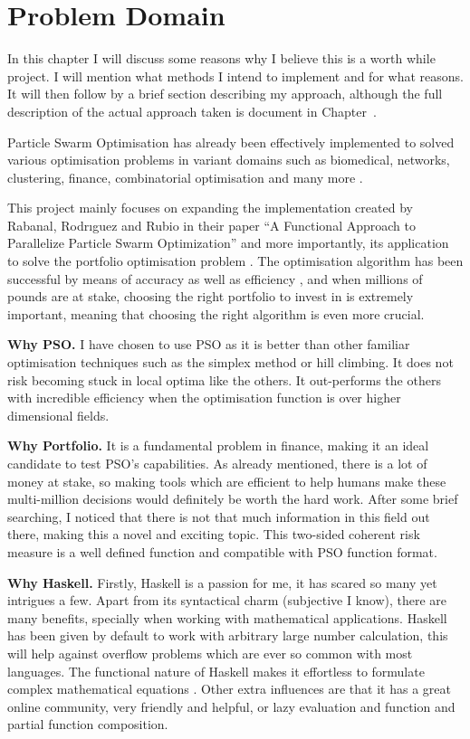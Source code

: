 \chapter{Problem Domain}

  In this chapter I will discuss some reasons why I believe this is a worth while project. I will mention what methods I intend to implement and for what reasons. It will then follow by a brief section describing my approach, although the full description of the actual approach taken is document in Chapter~.
  
  Particle Swarm Optimisation has already been effectively implemented to solved various optimisation problems \cite{pso_app,pso_app2,pso_app3} in variant domains such as biomedical, networks, clustering, finance, combinatorial optimisation and many more \cite{pso_app_main}. 

  This project mainly focuses on expanding the implementation created by Rabanal, Rodrıguez and Rubio in their paper ``A Functional Approach to Parallelize Particle Swarm Optimization'' and more importantly, its application to solve the portfolio optimisation problem \cite{marko2}. The optimisation algorithm has been successful by means of accuracy as well as efficiency \cite{haskellPSO}, and when millions of pounds are at stake, choosing the right portfolio to invest in is extremely important, meaning that choosing the right algorithm is even more crucial.

  \textbf{Why PSO.} I have chosen to use PSO as it is better than other familiar optimisation techniques such as the simplex method or hill climbing. It does not risk becoming stuck in local optima like the others. It out-performs the others with incredible efficiency when the optimisation function is over higher dimensional fields. 

  \textbf{Why Portfolio.} It is a fundamental problem in finance, making it an ideal candidate to test PSO's capabilities. As already mentioned, there is a lot of money at stake, so making tools which are efficient to help humans make these multi-million decisions would definitely be worth the hard work. After some brief searching, I noticed that there is not that much information in this field out there, making this a novel and exciting topic. This two-sided coherent risk measure is a well defined function and compatible with PSO function format. 

  \textbf{Why Haskell.} Firstly, Haskell is a passion for me, it has scared so many yet intrigues a few. Apart from its syntactical charm (subjective I know), there are many benefits, specially when working with mathematical applications. Haskell has been given by default to work with arbitrary large number calculation, this will help against overflow problems which are ever so common with most languages. The functional nature of Haskell makes it effortless to formulate complex mathematical equations \cite{haskellPSO}. Other extra influences are that it has a great online community, very friendly and helpful, or lazy evaluation and function and partial function composition. 

